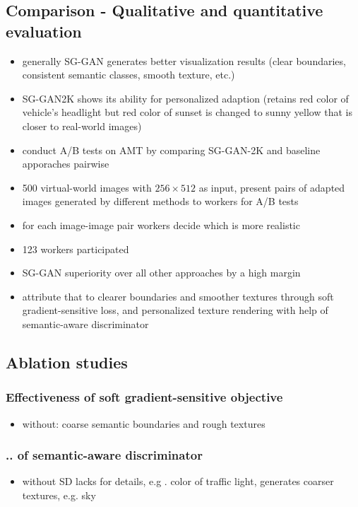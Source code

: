 \documentclass[]{article}
\begin{document}
\subsection{Comparison - Qualitative and quantitative evaluation}
\begin{itemize}
	\item generally SG-GAN generates better visualization results (clear boundaries, consistent semantic classes, smooth texture, etc.)
	\item SG-GAN2K shows its ability for personalized adaption (retains red color of vehicle's headlight but red color of sunset is changed to sunny yellow that is closer to real-world images)
	\item conduct A/B tests on AMT by comparing SG-GAN-2K and baseline apporaches pairwise
	\item 500 virtual-world images with $256 \times 512$ as input, present pairs of adapted images generated by different methods to workers for A/B tests
	\item for each image-image pair workers decide which is more realistic
	\item 123 workers participated 
	\item SG-GAN superiority over all other approaches by a high margin
	\item attribute that to clearer boundaries and smoother textures through soft gradient-sensitive loss, and personalized texture rendering with help of semantic-aware discriminator
\end{itemize}

\subsection{Ablation studies}
\subsubsection{Effectiveness of soft gradient-sensitive objective}
\begin{itemize}
	\item without: coarse semantic boundaries and rough textures
\end{itemize}

\subsubsection{.. of semantic-aware discriminator}
\begin{itemize}
	\item without SD lacks for details, e.g . color of traffic light, generates coarser textures, e.g. sky
\end{itemize}
\end{document}
